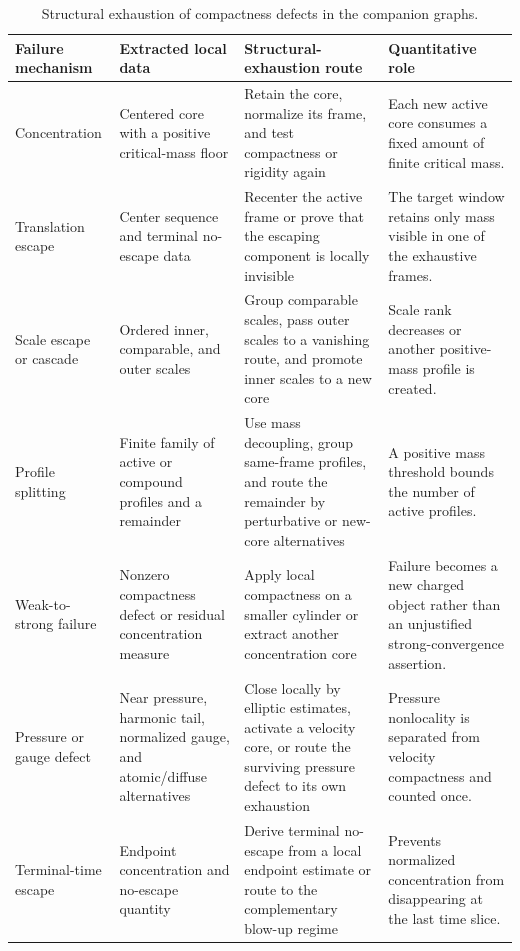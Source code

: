 \documentclass[11pt,reqno]{amsart}
\theoremstyle{plain}
\theoremstyle{definition}
\theoremstyle{remark}
\numberwithin{equation}{section}
\begin{document}
\begin{table}[H]
\caption{Structural exhaustion of compactness defects in the companion graphs.}
\label{tab:ns-compactness-routes}
\centering
\scriptsize
\begin{tabularx}{\textwidth}{@{}L{0.17\textwidth}L{0.24\textwidth}L{0.28\textwidth}Y@{}}
\toprule
Failure mechanism & Extracted local data & Structural-exhaustion route & Quantitative role \\
\midrule
Concentration & Centered core with a positive critical-mass floor & Retain the
core, normalize its frame, and test compactness or rigidity again & Each new
active core consumes a fixed amount of finite critical mass. \\
Translation escape & Center sequence and terminal no-escape data & Recenter the
active frame or prove that the escaping component is locally invisible & The
target window retains only mass visible in one of the exhaustive frames. \\
Scale escape or cascade & Ordered inner, comparable, and outer scales & Group
comparable scales, pass outer scales to a vanishing route, and promote inner
scales to a new core & Scale rank decreases or another positive-mass profile is
created. \\
Profile splitting & Finite family of active or compound profiles and a
remainder & Use mass decoupling, group same-frame profiles, and route the
remainder by perturbative or new-core alternatives & A positive mass threshold
bounds the number of active profiles. \\
Weak-to-strong failure & Nonzero compactness defect or residual concentration
measure & Apply local compactness on a smaller cylinder or extract another
concentration core & Failure becomes a new charged object rather than an
unjustified strong-convergence assertion. \\
Pressure or gauge defect & Near pressure, harmonic tail, normalized gauge, and
atomic/diffuse alternatives & Close locally by elliptic estimates, activate a
velocity core, or route the surviving pressure defect to its own exhaustion &
Pressure nonlocality is separated from velocity compactness and counted once. \\
Terminal-time escape & Endpoint concentration and no-escape quantity & Derive
terminal no-escape from a local endpoint estimate or route to the complementary
blow-up regime & Prevents normalized concentration from disappearing at the
last time slice. \\
\bottomrule
\end{tabularx}
\end{table}
\end{document}
